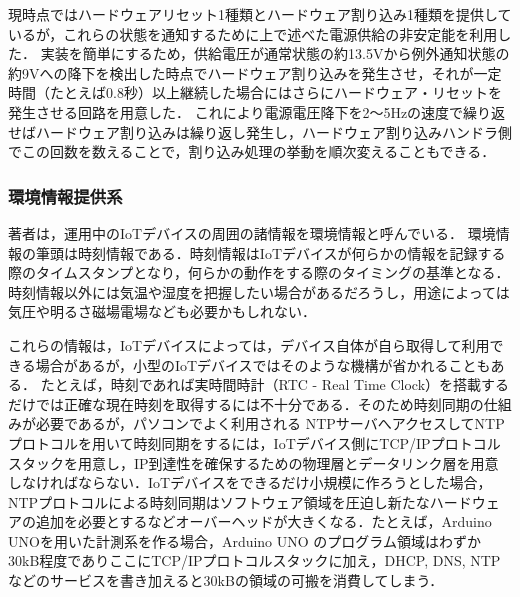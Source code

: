 現時点ではハードウェアリセット1種類とハードウェア割り込み1種類を提供しているが，これらの状態を通知するために上で述べた電源供給の非安定能を利用した．
実装を簡単にするため，供給電圧が通常状態の約13.5Vから例外通知状態の約9Vへの降下を検出した時点でハードウェア割り込みを発生させ，それが一定時間（たとえば0.8秒）以上継続した場合にはさらにハードウェア・リセットを発生させる回路を用意した．
これにより電源電圧降下を2〜5Hzの速度で繰り返せばハードウェア割り込みは繰り返し発生し，ハードウェア割り込みハンドラ側でこの回数を数えることで，割り込み処理の挙動を順次変えることもできる．




\subsubsection{環境情報提供系}


著者は，運用中のIoTデバイスの周囲の諸情報を環境情報と呼んでいる．
環境情報の筆頭は時刻情報である．時刻情報はIoTデバイスが何らかの情報を記録する際のタイムスタンプとなり，何らかの動作をする際のタイミングの基準となる．
時刻情報以外には気温や湿度を把握したい場合があるだろうし，用途によっては気圧や明るさ磁場電場なども必要かもしれない．

これらの情報は，IoTデバイスによっては，デバイス自体が自ら取得して利用できる場合があるが，小型のIoTデバイスではそのような機構が省かれることもある．
たとえば，時刻であれば実時間時計（RTC - Real Time Clock）を搭載するだけでは正確な現在時刻を取得するには不十分である．そのため時刻同期の仕組みが必要であるが，パソコンでよく利用される NTPサーバへアクセスしてNTPプロトコルを用いて時刻同期をするには，IoTデバイス側にTCP/IPプロトコルスタックを用意し，IP到達性を確保するための物理層とデータリンク層を用意しなければならない．IoTデバイスをできるだけ小規模に作ろうとした場合，NTPプロトコルによる時刻同期はソフトウェア領域を圧迫し新たなハードウェアの追加を必要とするなどオーバーヘッドが大きくなる．たとえば，Arduino UNOを用いた計測系を作る場合，Arduino UNO のプログラム領域はわずか 30kB程度でありここにTCP/IPプロトコルスタックに加え，DHCP, DNS, NTP などのサービスを書き加えると30kBの領域の可搬を消費してしまう．

